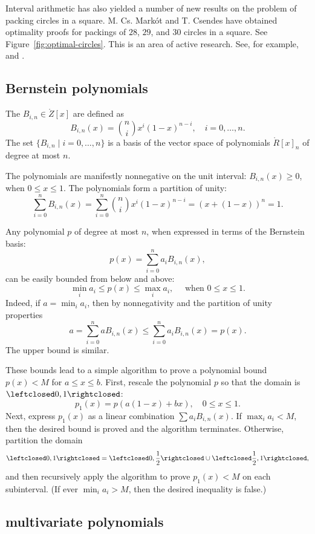 Interval arithmetic has also yielded a number of new results on the
problem of packing circles in a square. M. Cs. Mark\'ot and T. Csendes
have obtained optimality proofs for packings of $28$, $29$, and $30$
circles in a square.  See Figure~\ref{fig:optimal-circles}.  This is
an area of active research. See, for example, \cite{Sza07} and
\cite{Mark07}.


\subsection{Bernstein polynomials}

The  $B_{i,n}\in\ring{Z}[x]$ are defined as
\begin{equation}
B_{i,n}(x) = {n\choose i} x^i (1-x)^{n-i},\quad i=0,\ldots,n.
\end{equation}
The set $\{B_{i,n}\mid i=0,\ldots,n\}$ is a basis of the vector space
of polynomials $\ring{R}[x]_n$ of degree at most $n$.

The polynomials are manifestly nonnegative on the unit interval:
$B_{i,n}(x)\ge 0$, when $0\le x\le 1$.  The polynomials form a
partition of unity:
\[
\sum_{i=0}^n B_{i,n}(x) = \sum_{i=0}^n {n\choose i} x^i (1-x)^{n-i} = 
(x + (1-x))^n = 1.
\]

Any polynomial $p$ of degree at most $n$, 
when expressed in terms of the Bernstein basis:
\[
p(x) =  \sum_{i=0}^n a_i B_{i,n}(x),
\]
can be easily bounded from below and above:
\[
\min_i a_i \le p(x) \le \max_i a_i,\quad\text{ when } 0 \le x \le 1.
\]
Indeed, if $a = \min_i a_i$, then by nonnegativity and the partition
of unity properties
\[
a  =  \sum_{i=0}^n a B_{i,n}(x) \le \sum_{i=0}^n a_i B_{i,n}(x) = p(x).
\]
The upper bound is similar.

These bounds lead to a simple algorithm to prove a polynomial bound
$p(x) < M$ for $a\le x\le b$.  First, rescale the polynomial $p$ so
that the domain is $\leftclosed 0,1\rightclosed$:
\[
p_1(x) = p(a (1-x) + b x), \quad 0\le x \le 1.
\]
Next, express $p_1(x)$ as a linear combination $\sum a_i B_{i,n}(x)$.
If $\max_i a_i < M$, then the desired bound is proved and the algorithm
terminates.  Otherwise,
 partition the domain
\[
\leftclosed 0,1\rightclosed = \leftclosed  0,\frac{1}{2}\rightclosed
\cup \leftclosed  \frac{1}{2},1\rightclosed,
\]
and then recursively apply the algorithm to prove $p_1(x)<M$ on each
subinterval.   (If ever $\min_i a_i > M$, then the desired inequality is false.)


\subsection{multivariate polynomials}


